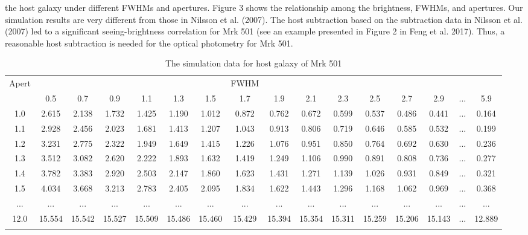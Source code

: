 \documentclass[structabstract]{raa}
\begin{document}
   the host galaxy under different FWHMs and apertures. Figure 3 shows the relationship among the brightness, FWHMs,
   and apertures. Our simulation results are very different from those in Nilsson et al. (2007). The host subtraction based
   on the subtraction data in Nilsson et al. (2007) led to a significant seeing-brightness correlation for Mrk 501 (see an
   example presented in Figure 2 in Feng et al. 2017). Thus, a reasonable host subtraction is needed for the optical
   photometry for Mrk 501.
\begin{table}
\begin{center}
\begin{minipage}[]{100mm}
\caption[]{The simulation data for host galaxy of Mrk 501}
\label{Table6}
 \end{minipage}
 \setlength{\tabcolsep}{2.5pt}
\small
\begin{tabular}{cccccccccccccccc}
\hline\noalign{\smallskip}
  Apert  &   &   &   &  &   &   & FWHM &  &   &  &  &   &   &   &   \\ \cline{2-16}

   & 0.5  & 0.7  & 0.9   & 1.1 & 1.3  & 1.5   & 1.7  & 1.9  & 2.1 & 2.3 & 2.5 & 2.7 & 2.9  & ... &  5.9 \\

\hline\noalign{\smallskip}
1.0   & 2.615  & 2.138  & 1.732  & 1.425  & 1.190  & 1.012  & 0.872  & 0.762  & 0.672  & 0.599  & 0.537  & 0.486  & 0.441  & ... & 0.164 \\
 1.1   & 2.928  & 2.456  & 2.023  & 1.681  & 1.413  & 1.207  & 1.043  & 0.913  & 0.806  & 0.719  & 0.646  & 0.585  & 0.532  & ... & 0.199 \\
 1.2   & 3.231  & 2.775  & 2.322  & 1.949  & 1.649  & 1.415  & 1.226  & 1.076  & 0.951  & 0.850  & 0.764  & 0.692  & 0.630  & ... & 0.236 \\
 1.3   & 3.512  & 3.082  & 2.620  & 2.222  & 1.893  & 1.632  & 1.419  & 1.249  & 1.106  & 0.990  & 0.891  & 0.808  & 0.736  & ... & 0.277 \\
 1.4   & 3.782  & 3.383  & 2.920  & 2.503  & 2.147  & 1.860  & 1.623  & 1.431  & 1.271  & 1.139  & 1.026  & 0.931  & 0.849  & ... & 0.321 \\
 1.5   & 4.034  & 3.668  & 3.213  & 2.783  & 2.405  & 2.095  & 1.834  & 1.622  & 1.443  & 1.296  & 1.168  & 1.062  & 0.969  & ... & 0.368 \\
 ...   & ...    & ...    & ...    & ...    & ...    & ...    & ...    & ...    & ...    & ...    & ...    & ...    & ...    & ... & ...   \\
 12.0  &15.554  &15.542  &15.527  &15.509  &15.486  &15.460  &15.429  &15.394  &15.354  &15.311  &15.259  &15.206  &15.143  & ... &12.889 \\
\noalign{\smallskip}\hline
\end{tabular}
\end{center}
\end{table}
\end{document}
